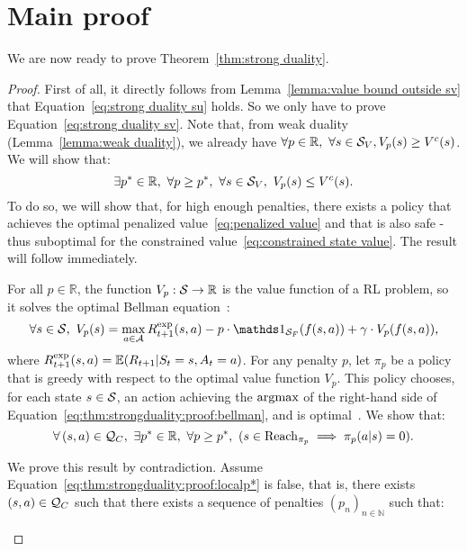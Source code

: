 \section{Main proof}
We are now ready to prove Theorem~\ref{thm:strong duality}.
\begin{proof}
	First of all, it directly follows from Lemma~\ref{lemma:value bound outside sv} that Equation~\eqref{eq:strong duality su} holds. So we only have to prove Equation~\eqref{eq:strong duality sv}. Note that, from weak duality (Lemma~\ref{lemma:weak duality}), we already have $\forall p\in\mathbb{R},~\forall s\in\SV, V_p(s) \geq V^c(s)$. We will show that:
	\begin{equation}
	\exists p^*\in\mathbb{R},~\forall p \geq p^*,~\forall s\in\SV,~V_p(s) \leq V^c(s).
	\label{eq:thm:strongduality:proof:converseinequality}
	\end{equation}
	To do so, we will show that, for high enough penalties, there exists a policy that achieves the optimal penalized value~\eqref{eq:penalized value} and that is also safe - thus suboptimal for the constrained value~\eqref{eq:constrained state value}. The result will follow immediately.\par
	For all $p\in\mathbb{R}$, the function $V_p: \S\to\mathbb{R}$ is the value function of a RL problem, so it solves the optimal Bellman equation~\cite[Chapter~3]{sutton2018reinforcement}:
	\begin{equation}
	\forall s\in\S,~ V_p(s) = \max_{a\in\A} \Rexp_{t+1}(s, a) - p \cdot \indicator_\SF(f(s,a)) + \gamma \cdot V_p(f(s,a)),
	\label{eq:thm:strongduality:proof:bellman}
	\end{equation}
	where $\Rexp_{t+1}(s, a) = \expected(R_{t+1}|S_t = s, A_t = a)$. For any penalty $p$, let $\pi_p$ be a policy that is greedy with respect to the optimal value function $V_p$. This policy chooses, for each state $s\in\S$, an action achieving the $\argmax$ of the right-hand side of Equation~\eqref{eq:thm:strongduality:proof:bellman}, and is optimal~\cite[Chapter~3]{sutton2018reinforcement}. We show that:
	\begin{equation}
	\forall\,(s,a)\in\QC,~\exists p^*\in\mathbb{R},~\forall p\geq p^*,~(s\in\reach_{\pi_p}\implies\pi_p(a|s) = 0).
	\label{eq:thm:strongduality:proof:localp*}
	\end{equation}
	\begin{subproof}
		We prove this result by contradiction. Assume Equation~\eqref{eq:thm:strongduality:proof:localp*} is false, that is, there exists $(s, a) \in\QC$ such that there exists a sequence of penalties $(p_n)_{n\in\mathbb{N}}$ such that:

\end{subproof}
\end{proof}

